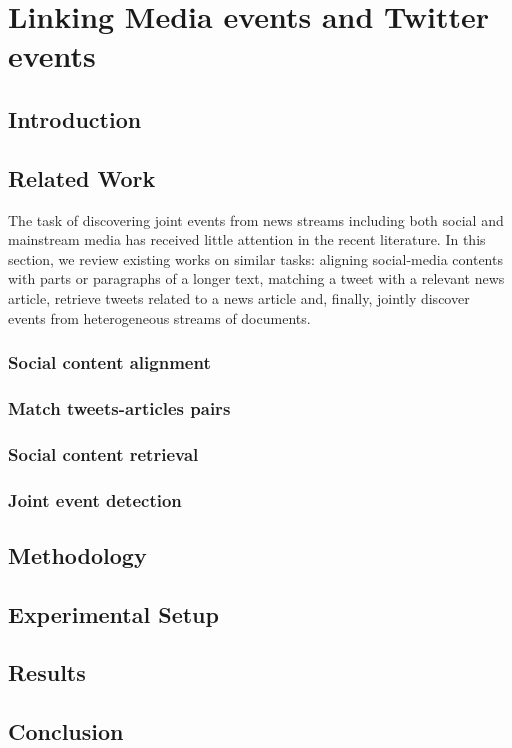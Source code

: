 \chapter{Linking Media events and Twitter events}
\section{Introduction}
\section{Related Work}

The task of discovering joint events from news streams including both social and mainstream media has received little attention in the recent literature. In this section, we review existing works on similar tasks: aligning social-media contents with parts or paragraphs of a longer text, matching a tweet with a relevant news article, retrieve tweets related to a news article and, finally, jointly discover events from heterogeneous streams of documents.

\subsection{Social content alignment}
\label{Social content alignment}
\cite{hu_et-lda:_2012}

\cite{hou2017learning}
\subsection{Match tweets-articles pairs}
\label{Match tweets-articles pairs}
\cite{guo_linking_2013}

\cite{zhao_interactive_2019}
\subsection{Social content retrieval}
\label{Social content retrieval}
\cite{suarez2018data}

\cite{ning_uncovering_2015}

\cite{tanev_enhancing_2012}

\cite{tsagkias_linking_2011}

\cite{danovitch2020linking}

\cite{wang_mining_2015}
\subsection{Joint event detection}
\label{Joint event detection}
\cite{thapen_early_2016}

\cite{hua_topical_2016}

\cite{mele_linking_2017}
\section{Methodology}
\section{Experimental Setup}
\section{Results}
\section{Conclusion}

